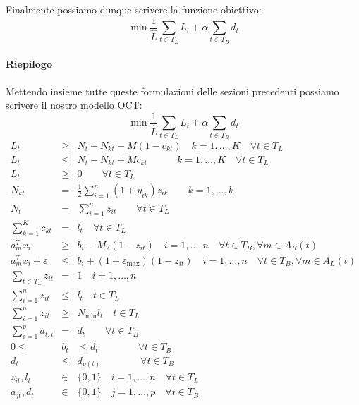 \documentclass{article}
\begin{document}
Finalmente possiamo dunque scrivere la funzione obiettivo:
\[ \min \frac{1}{\hat{L}}  \sum_{t \in T_L} L_t + \alpha \sum_{t \in T_B} d_t
\]

\paragraph{Riepilogo}

Mettendo insieme tutte queste formulazioni delle sezioni precedenti possiamo
scrivere il nostro modello OCT:
\[ \min \frac{1}{\hat{L}}  \sum_{t \in T_L} L_t + \alpha \sum_{t \in T_B} d_t
\]
\begin{eqnarray*}
  L_t & \geqslant & N_t - N_{k t} - M (1 - c_{k t}) \quad k = 1, \ldots, K
  \quad \forall t \in T_L\\
  L_t & \leqslant & N_t - N_{k t} + Mc_{k t} \hspace{3em} k = 1, \ldots, K
  \quad \forall t \in T_L\\
  L_t & \geqslant & 0 \qquad \forall t \in T_L\\
  N_{k t} & = & \frac{1}{2}  \sum_{i = 1}^n (1 + y_{i k}) z_{i k} \qquad k =
  1, \ldots, k\\
  N_t & = & \sum_{i = 1}^n z_{i t} \qquad \forall t \in T_L\\
  \sum_{k = 1}^K c_{k t} & = & l_t \quad \forall t \in T_L\\
  a_m^T x_i & \geqslant & b_i - M_2 (1 - z_{i t}) \quad i = 1, \ldots, n \quad
  \forall t \in T_B, \forall m \in A_R (t)\\
  a_m^T x_i + \varepsilon & \leqslant & b_i + (1 + \varepsilon_{\max}) (1 -
  z_{i t}) \quad i = 1, \ldots, n \quad \forall t \in T_B, \forall m \in A_L
  (t)\\
  \sum_{t \in T_L} z_{i t} & = & 1 \quad i = 1, \ldots, n \quad\\
  \sum_{i = 1}^n z_{i t} & \leqslant & l_t \quad t \in T_L \quad\\
  \sum_{i = 1}^n z_{i t} & \geqslant & N_{\min} l_t \quad t \in T_L \quad\\
  \sum_{i = 1}^p a_{t, i} & = & d_t \qquad \forall t \in T_B\\
  0 \leqslant & b_t & \leqslant d_t \hspace{4em} \forall t \in T_B\\
  d_t & \leqslant & d_{p (t)} \hspace{4em} \forall t \in T_B\\
  z_{i t}, l_t & \in & \{ 0, 1 \} \quad i = 1, \ldots, n \quad \forall t \in
  T_L\\
  a_{j t}, d_t & \in & \{ 0, 1 \} \quad j = 1, \ldots, p \quad \forall t \in
  T_B
\end{eqnarray*}
\end{document}

